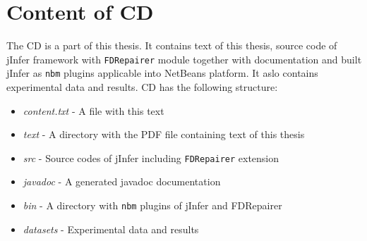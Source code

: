 \chapter{Content of CD}

The CD is a part of this thesis. It contains text of this thesis, source code of jInfer framework with \texttt{FDRepairer} module together with documentation and built jInfer as \texttt{nbm} plugins applicable into NetBeans platform. It aslo contains experimental data and results. CD has the following structure:

\begin{itemize}
	\item \textit{content.txt} - A file with this text
    \item \textit{text} - A directory with the PDF file containing text of this thesis
    \item \textit{src} - Source codes of jInfer including \texttt{FDRepairer} extension
    \item \textit{javadoc} - A generated javadoc documentation
    \item \textit{bin} - A directory with \texttt{nbm} plugins of jInfer and FDRepairer
    \item \textit{datasets} - Experimental data and results
\end{itemize}
